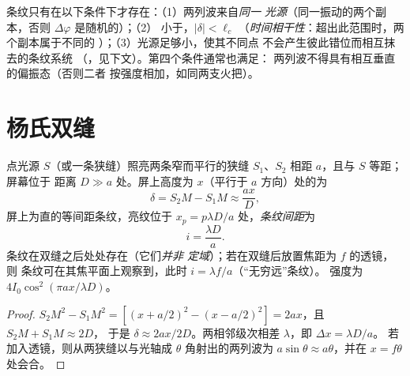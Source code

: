 \begin{remark}[三个条件]\label{rem:b2:two-wave-interference:conditions}
条纹只有在以下条件下才存在：（1）两列波来自\emph{同一
光源}（同一振动的两个副本，否则 $\Delta\varphi$ 是随机的）；（2）
小于，$|\delta| < \ell_c$
（\emph{时间相干性}：超出此范围时，两个副本属于不同的
）；（3）光源足够小，使其不同点
不会产生彼此错位而相互抹去的条纹系统
（\emph{}，见下文）。第四个条件通常也满足：
两列波不得具有相互垂直的偏振态（否则二者
按强度相加，如同两支火把）。
\end{remark}

\section{杨氏双缝}

\begin{proposition}\label{prop:b2:two-wave-interference:young}
点光源 $S$（或一条狭缝）照亮两条窄而平行的狭缝
$S_1$、$S_2$ 相距 $a$，且与 $S$ 等距；屏幕位于
距离 $D \gg a$ 处。屏上高度为 $x$（平行于
$a$ 方向）处的为
\[
\delta = S_2M - S_1M \approx \frac{ax}D ,
\]
屏上为直的等间距条纹，亮纹位于 $x_p =
p\lambda D/a$ 处，\emph{条纹间距}为
\[
i = \frac{\lambda D}a .
\]
条纹在双缝之后处处存在（它们\emph{并非
定域}）；若在双缝后放置焦距为 $f$ 的透镜，则
条纹可在其焦平面上观察到，此时 $i = \lambda f/a$（“无穷远”条纹）。
强度为 $4I_0\cos^2(\pi ax/\lambda D)$。
\end{proposition}

\begin{proof}
$S_2M^2 - S_1M^2 = [(x + a/2)^2 - (x - a/2)^2] = 2ax$，且 $S_2M + S_1M \approx 2D$，
于是 $\delta \approx 2ax/2D$。两相邻级次相差 $\lambda$，即 $\Delta x = \lambda D/a$。
若加入透镜，则从两狭缝以与光轴成 $\theta$
角射出的两列波为 $a\sin\theta \approx a\theta$，并在 $x = f\theta$ 处会合。
\end{proof}

